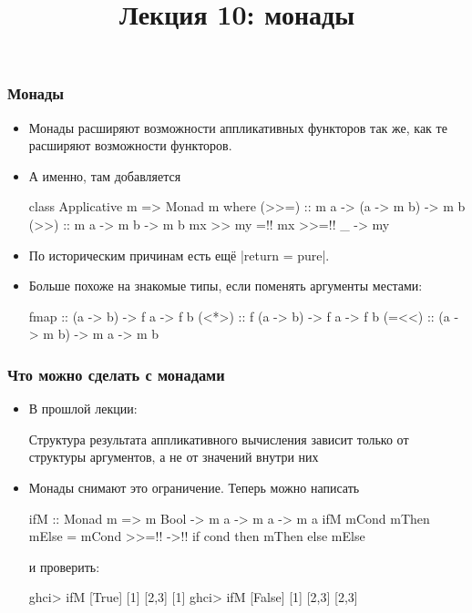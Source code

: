 \documentclass[11pt]{beamer}
\title{Лекция 10: монады}
\begin{document}
\begin{frame}[plain]
  \maketitle
\end{frame}

\begin{frame}[fragile]
  \frametitle{Монады}
  \begin{itemize}
    \item Монады расширяют возможности аппликативных функторов так же, как те расширяют возможности функторов.
    \item А именно, там добавляется
          \begin{haskell}
            class Applicative m => Monad m where
              (>>=) :: m a -> (a -> m b) -> m b
              (>>) :: m a -> m b -> m b
              mx >> my =!\pause! mx >>=!\pause! \_ -> my
          \end{haskell}
          \pause
    \item По историческим причинам есть ещё \haskinline|return = pure|.
          \pause
    \item Больше похоже на знакомые типы, если поменять аргументы местами:
          \begin{haskell}
            fmap  ::   (a -> b) -> f a -> f b
            (<*>) :: f (a -> b) -> f a -> f b
            (=<<) :: (a -> m b) -> m a -> m b
          \end{haskell}
  \end{itemize}
\end{frame}

\begin{frame}[fragile]
  \frametitle{Что можно сделать с монадами}
  \begin{itemize}
    \item В прошлой лекции:
          \begin{displayquote}
            Структура результата аппликативного вычисления зависит только от структуры аргументов, а не от значений внутри них
          \end{displayquote}
    \item Монады снимают это ограничение. Теперь можно написать
          \begin{haskell}
            ifM :: Monad m => m Bool -> m a -> m a -> m a
            ifM mCond mThen mElse = mCond >>=!\pause! \cond ->!\pause!
              if cond then mThen else mElse
          \end{haskell}
          и проверить:
          \begin{haskell}
            ghci> ifM [True] [1] [2,3]
            [1]
            ghci> ifM [False] [1] [2,3]
            [2,3]
          \end{haskell}
  \end{itemize}
\end{frame}
\end{document}

